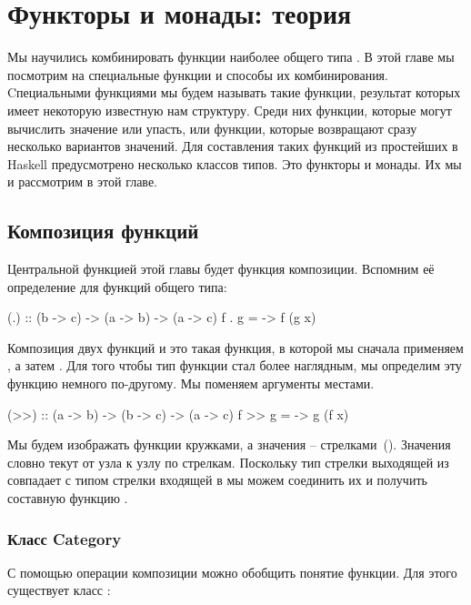 \chapter{Функторы и монады: теория}

Мы научились комбинировать функции наиболее общего типа . В
этой главе мы посмотрим на специальные функции и способы их
комбинирования. Cпециальными функциями мы будем называть такие функции,
результат которых имеет некоторую известную нам структуру. Среди них
функции, которые могут вычислить значение или упасть, или функции,
которые возвращают сразу несколько вариантов значений. Для составления
таких функций из простейших в Haskell предусмотрено несколько классов
типов. Это функторы и монады. Их мы и рассмотрим в этой главе.

\section{Композиция функций}

Центральной функцией этой главы будет функция композиции. Вспомним её
определение для функций общего типа:


\begin{code}
(.) :: (b -> c) -> (a -> b) -> (a -> c)
f . g = \x -> f (g x)
\end{code}

Композиция двух функций  и  это такая функция, в которой мы
сначала применяем , а затем . Для того чтобы тип функции
стал более наглядным, мы определим эту функцию немного по-другому. Мы
поменяем аргументы местами.


\begin{code}
(>>) :: (a -> b) -> (b -> c) -> (a -> c)
f >> g = \x -> g (f x)
\end{code}

Мы будем изображать функции кружками, а значения --
стрелками~(). Значения словно текут от узла к узлу по
стрелкам. Поскольку тип стрелки выходящей из  совпадает с типом
стрелки входящей в  мы можем соединить их и получить составную
функцию .


\subsection{Класс Category}

С помощью операции композиции можно обобщить понятие функции. Для этого
существует класс  :


